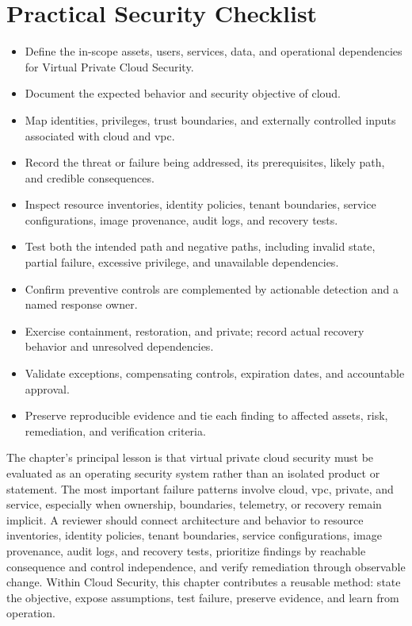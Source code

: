 \documentclass[11pt]{article}
\begin{document}
\section*{Practical Security Checklist}
\begin{itemize}[label=$\square$]
\item Define the in-scope assets, users, services, data, and operational dependencies for Virtual Private Cloud Security.
\item Document the expected behavior and security objective of cloud.
\item Map identities, privileges, trust boundaries, and externally controlled inputs associated with cloud and vpc.
\item Record the threat or failure being addressed, its prerequisites, likely path, and credible consequences.
\item Inspect resource inventories, identity policies, tenant boundaries, service configurations, image provenance, audit logs, and recovery tests.
\item Test both the intended path and negative paths, including invalid state, partial failure, excessive privilege, and unavailable dependencies.
\item Confirm preventive controls are complemented by actionable detection and a named response owner.
\item Exercise containment, restoration, and private; record actual recovery behavior and unresolved dependencies.
\item Validate exceptions, compensating controls, expiration dates, and accountable approval.
\item Preserve reproducible evidence and tie each finding to affected assets, risk, remediation, and verification criteria.
\end{itemize}
\begin{synthesisbox}
The chapter's principal lesson is that virtual private cloud security must be evaluated as an operating security system rather than an isolated product or statement. The most important failure patterns involve cloud, vpc, private, and service, especially when ownership, boundaries, telemetry, or recovery remain implicit. A reviewer should connect architecture and behavior to resource inventories, identity policies, tenant boundaries, service configurations, image provenance, audit logs, and recovery tests, prioritize findings by reachable consequence and control independence, and verify remediation through observable change. Within Cloud Security, this chapter contributes a reusable method: state the objective, expose assumptions, test failure, preserve evidence, and learn from operation.
\end{synthesisbox}
\end{document}
